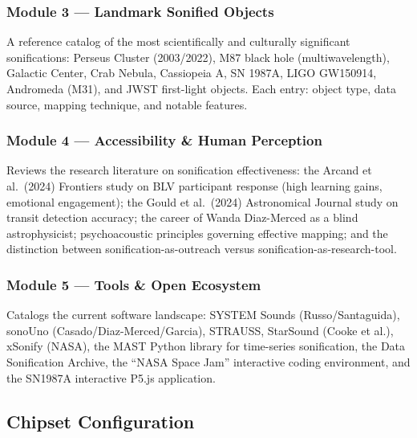 \documentclass[11pt,letterpaper]{article}
\begin{document}
\subsubsection{Module 3 — Landmark Sonified Objects}
A reference catalog of the most scientifically and culturally significant sonifications: Perseus Cluster (2003/2022), M87 black hole (multiwavelength), Galactic Center, Crab Nebula, Cassiopeia A, SN 1987A, LIGO GW150914, Andromeda (M31), and JWST first-light objects. Each entry: object type, data source, mapping technique, and notable features.

\subsubsection{Module 4 — Accessibility \& Human Perception}
Reviews the research literature on sonification effectiveness: the Arcand et al.\ (2024) Frontiers study on BLV participant response (high learning gains, emotional engagement); the Gould et al.\ (2024) Astronomical Journal study on transit detection accuracy; the career of Wanda Diaz-Merced as a blind astrophysicist; psychoacoustic principles governing effective mapping; and the distinction between sonification-as-outreach versus sonification-as-research-tool.

\subsubsection{Module 5 — Tools \& Open Ecosystem}
Catalogs the current software landscape: SYSTEM Sounds (Russo/Santaguida), sonoUno (Casado/Diaz-Merced/Garcia), STRAUSS, StarSound (Cooke et al.), xSonify (NASA), the MAST Python library for time-series sonification, the Data Sonification Archive, the ``NASA Space Jam'' interactive coding environment, and the SN1987A interactive P5.js application.

\subsection{Chipset Configuration}
\end{document}
